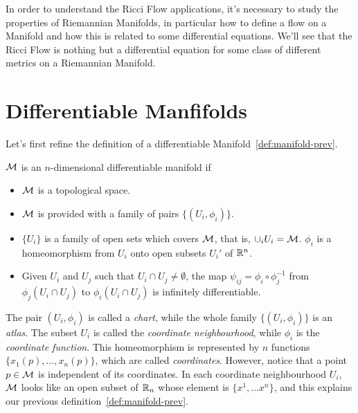 In order to understand the Ricci Flow applications, it's necessary to study the properties of Riemannian Manifolds, in particular how to define a flow on a Manifold and how this is related to some differential equations. We'll see that the Ricci Flow is nothing but a differential equation for some class of different metrics on a Riemannian Manifold.

\section{Differentiable Manfifolds}
Let's first refine the definition of a differentiable Manifold~\ref{def:manifold-prev}.

\begin{definition}
    $\mathcal{M}$ is an $n$-dimensional differentiable manifold if
    \begin{itemize}
        \item $\mathcal{M}$ is a topological space.
        \item $\mathcal{M}$ is provided with a family of pairs $\{ (U_i, \phi_i) \}$.
        \item $\{U_i\}$ is a family of open sets which covers $\mathcal{M}$, that is, $\cup_i U_i = \mathcal{M}$. $\phi_i$ is a homeomorphism from $U_i$ onto open subsets $U_i'$ of $\mathbb{R}^n$.
        \item Given $U_i$ and $U_j$ such that $U_i \cap U_j \neq \emptyset$, the map $\psi_{ij} = \phi_i \circ \phi_j^{-1}$ from $\phi_j (U_i \cap U_j)$ to $\phi_i(U_i \cap U_j)$ is infinitely differentiable.
    \end{itemize}
\end{definition}

The pair $(U_i, \phi_i)$ is called a \emph{chart}, while the whole family $\{(U_i, \phi_i)\}$ is an \emph{atlas}. The subset $U_i$ is called the \emph{coordinate neighbourhood}, while $\phi_i$ is the \emph{coordinate function}. This homeomorphism is represented by $n$ functions $\{x_1(p), \dots, x_n(p)\}$, which are called \emph{coordinates}. However, notice that a point $p\in\mathcal{M}$ is independent of its coordinates. In each coordinate neighbourhood $U_i$, $\mathcal{M}$ looks like an open subset of $\mathbb{R}_n$ whose element is $\{x^1, \dots x^n\}$, and this explains our previous definition~\ref{def:manifold-prev}.